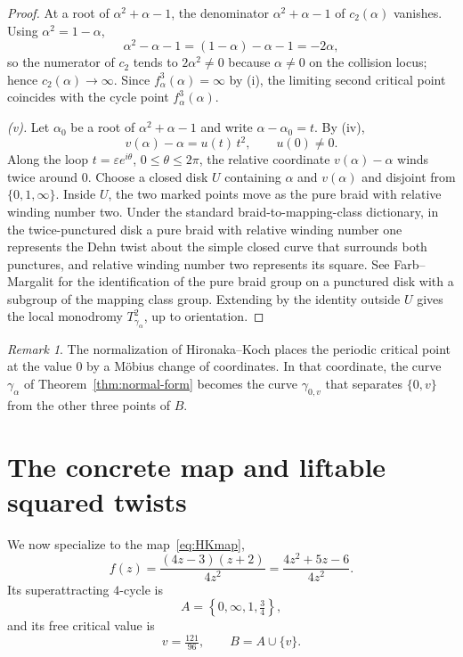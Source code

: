 \documentclass[12pt]{article}
\theoremstyle{definition}
\theoremstyle{remark}
\newtheorem{remark}[theorem]{Remark}
\numberwithin{equation}{section}
\begin{document}
\begin{proof}
At a root of $\alpha^{2}+\alpha-1$, the denominator
$\alpha^{2}+\alpha-1$ of $c_{2}(\alpha)$ vanishes.  Using
$\alpha^{2}=1-\alpha$,
\[
\alpha^{2}-\alpha-1=(1-\alpha)-\alpha-1=-2\alpha,
\]
so the numerator of $c_{2}$ tends to $2\alpha^{2}\neq0$ because
$\alpha\neq0$ on the collision locus; hence
$c_{2}(\alpha)\to\infty$.  Since $f_{\alpha}^{3}(\alpha)=\infty$ by
(i), the limiting second critical point coincides with the cycle point
$f_{\alpha}^{3}(\alpha)$.

\emph{(v).}  Let $\alpha_{0}$ be a root of $\alpha^{2}+\alpha-1$ and
write $\alpha-\alpha_{0}=t$.  By (iv),
\[
v(\alpha)-\alpha =u(t)\,t^{2},\qquad u(0)\neq0.
\]
Along the loop $t=\varepsilon e^{i\theta}$, $0\le\theta\le2\pi$, the
relative coordinate $v(\alpha)-\alpha$ winds twice around $0$.  Choose a
closed disk $U$ containing $\alpha$ and $v(\alpha)$ and disjoint from
$\{0,1,\infty\}$.  Inside $U$, the two marked points move as the pure
braid with relative winding number two.  Under the standard
braid-to-mapping-class dictionary, in the twice-punctured disk a pure
braid with relative winding number one represents the Dehn twist about
the simple closed curve that surrounds both punctures, and relative
winding number two represents its square.  See Farb--Margalit
\cite[Chapter~9, Theorem~9.1 and \S9.1]{FM} for the identification of
the pure braid group on a punctured disk with a subgroup of the mapping
class group.  Extending by the identity outside $U$ gives the local
monodromy $T_{\gamma_{\alpha}}^{2}$, up to orientation.
\end{proof}

\begin{remark}
\label{rem:coord-change}
The normalization of Hironaka--Koch \cite[\S4]{HK} places the periodic
critical point at the value $0$ by a M\"obius change of coordinates.  In
that coordinate, the curve $\gamma_{\alpha}$ of
Theorem~\ref{thm:normal-form} becomes the curve $\gamma_{0,v}$ that
separates $\{0,v\}$ from the other three points of $B$.
\end{remark}

\section{The concrete map and liftable squared twists}
\label{sec:preservation}

We now specialize to the map~\eqref{eq:HKmap},
\[
f(z)=\frac{(4z-3)(z+2)}{4z^{2}}
=\frac{4z^{2}+5z-6}{4z^{2}}.
\]
Its superattracting $4$-cycle is
\[
A=\left\{0,\infty,1,\tfrac34\right\},
\]
and its free critical value is
\[
v=\tfrac{121}{96},\qquad
B=A\cup\{v\}.
\]
\end{document}
